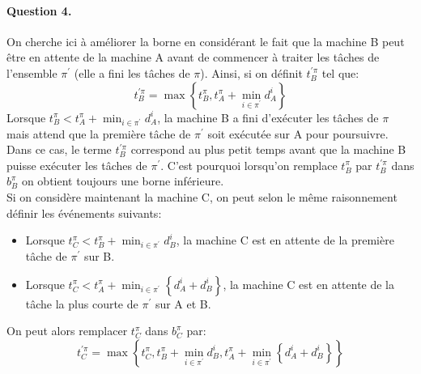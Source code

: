 \documentclass[a4paper, 10pt]{article}
\begin{document}
		\paragraph{Question 4.}{On cherche ici à améliorer la borne en considérant le fait que la machine B peut être en attente de la machine A avant de commencer à traiter les tâches de l'ensemble $\pi^\prime$ (elle a fini les tâches de $\pi$). Ainsi, si on définit $t^{\prime\pi}_B$ tel que:
		\begin{equation*}
			t^{\prime\pi}_B = \max \left\{ t^{\pi}_B, t^{\pi}_A + \min_{i \in \pi^\prime} d^i_A \right\}
		\end{equation*}
		Lorsque $t^{\pi}_B < t^{\pi}_A + \min_{i \in \pi^\prime} d^i_A$, la machine B a fini d'exécuter les tâches de $\pi$ mais attend que la première tâche de $\pi^\prime$ soit exécutée sur A pour poursuivre. Dans ce cas, le terme $t^{\prime\pi}_B$ correspond au plus petit temps avant que la machine B puisse exécuter les tâches de $\pi^\prime$. C'est pourquoi lorsqu'on remplace $t^\pi_B$ par $t^{\prime\pi}_B$ dans $b^\pi_B$ on obtient toujours une borne inférieure.\\
		
		Si on considère maintenant la machine C, on peut selon le même raisonnement définir les événements suivants:
		\begin{itemize}
			\item Lorsque $t^{\pi}_C < t^{\pi}_B + \min_{i \in \pi^\prime} d^i_B$, la machine C est en attente de la première tâche de $\pi^\prime$ sur B.
			\item Lorsque $t^\pi_C < t^\pi_A + \min_{i \in \pi^\prime} \left\{ d^i_A + d^i_B \right\}$, la machine C est en attente de la tâche la plus courte de $\pi^\prime$ sur A et B.
		\end{itemize}
		
		On peut alors remplacer $t^\pi_C$ dans $b^\pi_C$ par:
		\begin{equation*}
			t^{\prime\pi}_C = \max \left\{ t^{\pi}_C, t^{\pi}_B + \min_{i \in \pi^\prime} d^i_B,  t^\pi_A + \min_{i \in \pi^\prime} \left\{ d^i_A + d^i_B \right\} \right\}
		\end{equation*}
		}
		
\end{document}
